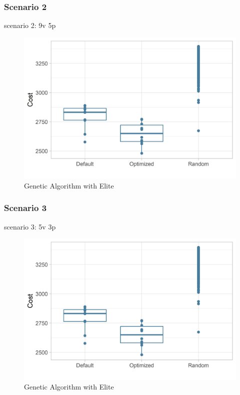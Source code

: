 \subsubsection{Scenario 2}
scenario 2: 9v 5p
\begin{figure}[ht] 
	\label{figure:sim_2_comparison}
	\includegraphics[width=1\linewidth]{simulations/evaluation/plots/sim_1_comparison}
	\caption{Genetic Algorithm with Elite}
\end{figure}


\subsubsection{Scenario 3}
scenario 3: 5v 3p
\begin{figure}[ht] 
	\label{figure:sim_3_comparison}
	\includegraphics[width=1\linewidth]{simulations/evaluation/plots/sim_1_comparison}
	\caption{Genetic Algorithm with Elite}
\end{figure}

